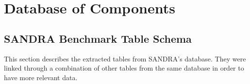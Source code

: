 

\chapter{Database of Components} \label{app:database_components}
    \section{SANDRA Benchmark Table Schema}\label{app:sandra_benchmark_table_schema}
        This section describes the extracted tables from SANDRA's database. They were linked through a combination of other tables from the same database in order to have more relevant data.

